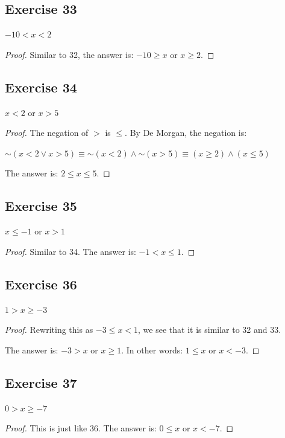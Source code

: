 \documentclass[14pt]{extarticle}
\begin{document}
\subsection{Exercise 33} 
$-10 < x < 2$

\begin{proof} 
Similar to 32, the answer is: $-10 \geq x$ or $x \geq 2$.
\end{proof}

\subsection{Exercise 34} 
$x < 2$ or $x > 5$

\begin{proof} 
The negation of $>$ is $\leq$. By De Morgan, the negation is:

${\sim(x < 2 \vee x > 5)} \equiv {\sim (x < 2)} \wedge {\sim (x > 5)} \equiv (x \geq 2) \wedge (x \leq 5)$

The answer is: $2 \leq x \leq 5$. 
\end{proof}

\subsection{Exercise 35} 
$x \leq -1$ or $x > 1$

\begin{proof} 
Similar to 34. The answer is: $-1 < x \leq 1$. 
\end{proof}

\subsection{Exercise 36} 
$1 > x \geq -3$

\begin{proof} 
Rewriting this as $-3 \leq x < 1$, we see that it is similar to 32 and 33.

The answer is: $-3 > x$ or $x \geq 1$. In other words: $1 \leq x$ or $x < -3$.
\end{proof}

\subsection{Exercise 37} 
$0 > x \geq -7$

\begin{proof} 
This is just like 36. The answer is: $0 \leq x$ or $x < -7$.
\end{proof}
\end{document}
